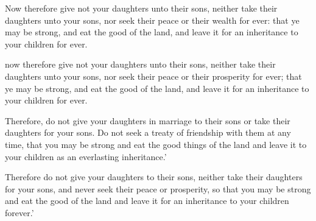 			Now therefore give not your daughters unto their sons, neither take their daughters unto your sons, nor seek their peace or their wealth for ever: that ye may be strong, and eat the good of the land, and leave it for an inheritance to your children for ever.

			\begin{versebox}
					\item[BHS] 
					\item[LXX] 
					\item[ASV] now therefore give not your daughters unto their sons, neither take their daughters unto your sons, nor seek their peace or their prosperity for ever; that ye may be strong, and eat the good of the land, and leave it for an inheritance to your children for ever.
					\item[NIV] Therefore, do not give your daughters in marriage to their sons or take their daughters for your sons. Do not seek a treaty of friendship with them at any time, that you may be strong and eat the good things of the land and leave it to your children as an everlasting inheritance.’
					\item[NRSV] Therefore do not give your daughters to their sons, neither take their daughters for your sons, and never seek their peace or prosperity, so that you may be strong and eat the good of the land and leave it for an inheritance to your children forever.’
			\end{versebox}

